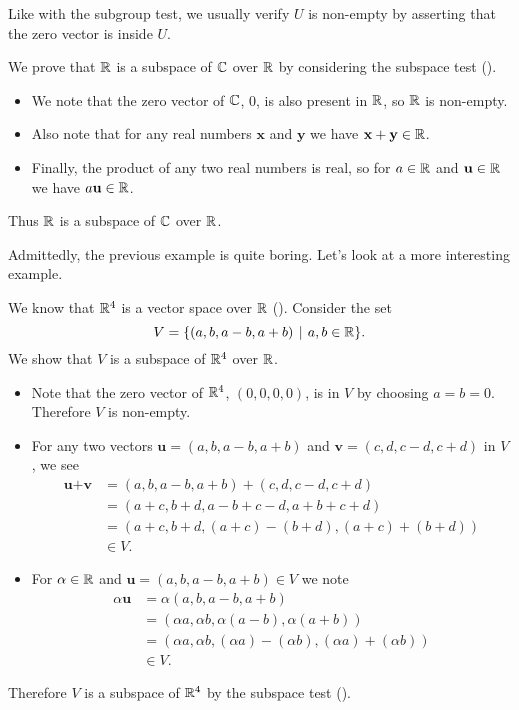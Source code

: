 \begin{remark}
    Like with the subgroup test, we usually verify $U$ is non-empty by asserting that the zero vector is inside $U$.
\end{remark}

\begin{example}
    We prove that $\mathbb{R}$ is a subspace of $\mathbb{C}$ over $\mathbb{R}$ by considering the subspace test ().
    \begin{itemize}
        \item We note that the zero vector of $\mathbb{C}$, 0, is also present in $\mathbb{R}$, so $\mathbb{R}$ is non-empty.
        \item Also note that for any real numbers $\textbf{x}$ and $\textbf{y}$ we have $\textbf{x} + \textbf{y} \in \mathbb{R}$.
        \item Finally, the product of any two real numbers is real, so for $a \in \mathbb{R}$ and $\textbf{u} \in \mathbb{R}$ we have $a\textbf{u} \in \mathbb{R}$.
    \end{itemize}
    Thus $\mathbb{R}$ is a subspace of $\mathbb{C}$ over $\mathbb{R}$.
\end{example}

Admittedly, the previous example is quite boring. Let's look at a more interesting example.
\begin{example}
    We know that $\mathbb{R}^4$ is a vector space over $\mathbb{R}$ (). Consider the set
    \[
        V = \{(a, b, a-b, a+b) \vert a, b \in \R\}.
    \]
    We show that $V$ is a subspace of $\mathbb{R}^4$ over $\mathbb{R}$.
    \begin{itemize}
        \item Note that the zero vector of $\mathbb{R}^4$, $(0,0,0,0)$, is in $V$ by choosing $a = b = 0$. Therefore $V$ is non-empty.
        \item For any two vectors $\textbf{u} = (a, b, a-b, a+b)$ and $\textbf{v} = (c, d, c-d, c+d)$ in $V$, we see
        \begin{align*}
            \textbf{u} + \textbf{v} &= (a, b, a-b, a+b) + (c, d, c-d, c+d)\\
            &= (a + c, b + d, a - b + c - d, a + b + c + d)\\
            &= (a+c, b+d, (a+c)-(b+d), (a+c)+(b+d))\\
            &\in V.
        \end{align*}
        \item For $\alpha \in \mathbb{R}$ and $\textbf{u} = (a, b, a-b, a+b) \in V$ we note
        \begin{align*}
            \alpha\textbf{u} &= \alpha(a, b, a-b, a+b)\\
            &= (\alpha a, \alpha b, \alpha(a-b), \alpha(a+b))\\
            &= (\alpha a, \alpha b, (\alpha a) - (\alpha b), (\alpha a) + (\alpha b))\\
            &\in V.
        \end{align*}
    \end{itemize}
    Therefore $V$ is a subspace of $\mathbb{R}^4$ by the subspace test ().
\end{example}

